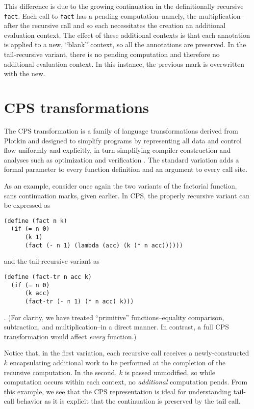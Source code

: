 \documentclass[ms,electronic,twosidetoc,letterpaper,chaptercenter,parttop]{byumsphd}
\begin{document}
This difference is due to the growing continuation in the definitionally recursive
\texttt{fact}. Each call to \texttt{fact} has a pending computation--namely, the
multiplication--after the recursive call and so each necessitates the creation an
additional evaluation context. The effect of these additional contexts is that each
annotation is applied to a new, ``blank'' context, so all the annotations are preserved. 
In the tail-recursive variant, there is no pending computation and therefore no additional
evaluation context. In this instance, the previous mark is overwritten with the new.

\section{CPS transformations}

The CPS transformation is a family of language transformations derived from Plotkin \cite{plotkin1975call} and designed to simplify  programs by representing all data and control flow uniformly and explicitly, in turn simplifying compiler construction and analyses such as optimization and verification \cite{sabry1994formal}. The standard variation adds a formal parameter to every function definition and an argument to every call site.

As an example, consider once again the two variants of the factorial function, sans continuation 
marks, given earlier. In CPS, the properly recursive variant can be expressed as
\begin{verbatim}
(define (fact n k) 
  (if (= n 0)
      (k 1)
      (fact (- n 1) (lambda (acc) (k (* n acc))))))
\end{verbatim}
and the tail-recursive variant as
\begin{verbatim}
(define (fact-tr n acc k)
  (if (= n 0)
      (k acc)
      (fact-tr (- n 1) (* n acc) k)))
\end{verbatim}. (For clarity, we have treated ``primitive'' functions--equality 
comparison, subtraction, and multiplication--in a direct manner. In contrast, a 
full CPS transformation would affect \emph{every} function.)

Notice that, in the first variation, each recursive call receives a newly-constructed 
$k$ encapsulating additional work to be performed at the completion of the recursive 
computation. In the second, $k$ is passed unmodified, so while computation occurs 
within each context, no \emph{additional} computation pends. From this example, we 
see that the CPS representation is ideal for understanding tail-call behavior as it 
is explicit that the continuation is preserved by the tail call.
\end{document}
